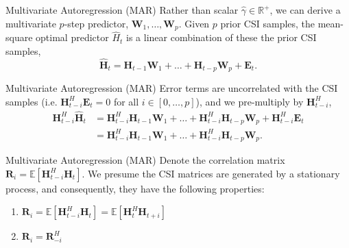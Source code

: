 \documentclass{beamer}
\begin{document}
  \begin{frame}{Multivariate Autoregression (MAR)}
    Rather than scalar $\hat\gamma \in \mathbb R^+$, we can derive a multivariate $p$-step predictor, $\mathbf W_1, \dots, \mathbf W_p$.
    Given $p$ prior CSI samples, the mean-square optimal predictor
    $\hat H_t$ is a linear combination of these the prior CSI samples,
    \begin{equation}
    \mathbf{\hat H}_{t} = \mathbf{H}_{t-1} \mathbf W_{1} + \dots + \mathbf{H}_{t-p} \mathbf W_{p} + \mathbf E_t.
    \end{equation}
  \end{frame}

  \begin{frame}{Multivariate Autoregression (MAR)}
    Error terms are uncorrelated with the CSI samples
    (i.e. $\mathbf H_{t-i}^H \mathbf E_t = 0$ for all $i \in [0, \dots, p]$),
    and we pre-multiply by $\mathbf H_{t-i}^H$,
    \begin{align}
    \mathbf{H}_{t-i}^H\mathbf{\hat H}_{t} &= \mathbf{H}_{t-i}^H\mathbf{H}_{t-1} \mathbf W_{1} + \dots + \mathbf{H}_{t-i}^H\mathbf{H}_{t-p} \mathbf W_{p} + \mathbf{H}_{t-i}^H\mathbf E_t \nonumber \\
                        &= \mathbf{H}_{t-i}^H\mathbf{H}_{t-1} \mathbf W_{1} + \dots + \mathbf{H}_{t-i}^H\mathbf{H}_{t-p} \mathbf W_{p}. \label{eq:var-init}
    \end{align}
  \end{frame}

  \begin{frame}{Multivariate Autoregression (MAR)}
    Denote the correlation matrix 
    $\mathbf R_i = \mathbb E [\mathbf H^H_{t-i}\mathbf H_{t}]$.
    We presume the CSI matrices are generated by a 
    stationary process, and consequently, 
    they have the following properties:
    \begin{enumerate}
      \item $\mathbf R_i = \mathbb E [\mathbf H^H_{t-i}\mathbf H_{t}] = \mathbb E [\mathbf H^H_{t}\mathbf H_{t+i}]$
      \item $\mathbf R_i = \mathbf R^H_{-i}$
    \end{enumerate}
  \end{frame}
\end{document}
